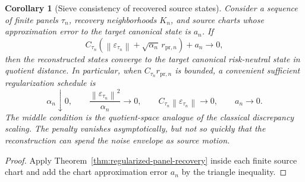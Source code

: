 \documentclass[11pt,a4paper]{amsart}
\theoremstyle{plain}
\newtheorem{corollary}[theorem]{Corollary}
\theoremstyle{definition}
\theoremstyle{remark}
\newcommand{\eps}{\varepsilon}
\newcommand{\norm}[1]{\left\lVert #1\right\rVert}
\begin{document}
\begin{corollary}[Sieve consistency of recovered source states]\label{cor:sieve-consistency}
Consider a sequence of finite panels \(\tau_n\), recovery neighborhoods \(K_n\), and source
charts whose approximation error to the target canonical state is \(a_n\).  If
\[
        C_{\tau_n}
        \left(
        \norm{\eps_{\tau_n}}
        +
        \sqrt{\alpha_n}\,r_{\mathrm{pr},n}
        \right)
        +a_n
        \longrightarrow0,
\]
then the reconstructed states converge to the target canonical risk-neutral state in quotient
distance.
In particular, when \(C_{\tau_n}r_{\mathrm{pr},n}\) is bounded, a convenient sufficient
regularization schedule is
\[
        \alpha_n\downarrow0,
        \qquad
        \frac{\norm{\eps_{\tau_n}}^2}{\alpha_n}\longrightarrow0,
        \qquad
        C_{\tau_n}\norm{\eps_{\tau_n}}\longrightarrow0,
        \qquad
        a_n\longrightarrow0 .
\]
The middle condition is the quotient-space analogue of the classical discrepancy scaling.  The
penalty vanishes asymptotically, but not so quickly that the reconstruction can spend the noise
envelope as source motion.
\end{corollary}

\begin{proof}
Apply Theorem~\ref{thm:regularized-panel-recovery} inside each finite source chart and add the
chart approximation error \(a_n\) by the triangle inequality.
\end{proof}
\end{document}
